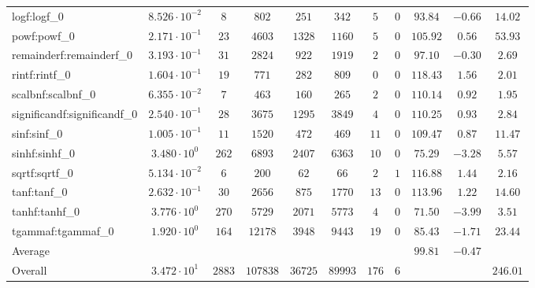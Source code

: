 \begin{tabular}{|l|c|c|c|c|c|c|c|c|c|c|}
logf:logf\_0                 & $ 8.526 \cdot 10^{-2} $ & $ 8      $ & $ 802    $ & $ 251   $ & $ 342   $ & $ 5   $ & $ 0 $ & $ 93.84       $ & $ -0.66   $ & $ 14.02   $ \\
powf:powf\_0                 & $ 2.171 \cdot 10^{-1} $ & $ 23     $ & $ 4603   $ & $ 1328  $ & $ 1160  $ & $ 5   $ & $ 0 $ & $ 105.92      $ & $ 0.56    $ & $ 53.93   $ \\
remainderf:remainderf\_0     & $ 3.193 \cdot 10^{-1} $ & $ 31     $ & $ 2824   $ & $ 922   $ & $ 1919  $ & $ 2   $ & $ 0 $ & $ 97.10       $ & $ -0.30   $ & $ 2.69    $ \\
rintf:rintf\_0               & $ 1.604 \cdot 10^{-1} $ & $ 19     $ & $ 771    $ & $ 282   $ & $ 809   $ & $ 0   $ & $ 0 $ & $ 118.43      $ & $ 1.56    $ & $ 2.01    $ \\
scalbnf:scalbnf\_0           & $ 6.355 \cdot 10^{-2} $ & $ 7      $ & $ 463    $ & $ 160   $ & $ 265   $ & $ 2   $ & $ 0 $ & $ 110.14      $ & $ 0.92    $ & $ 1.95    $ \\
significandf:significandf\_0 & $ 2.540 \cdot 10^{-1} $ & $ 28     $ & $ 3675   $ & $ 1295  $ & $ 3849  $ & $ 4   $ & $ 0 $ & $ 110.25      $ & $ 0.93    $ & $ 2.84    $ \\
sinf:sinf\_0                 & $ 1.005 \cdot 10^{-1} $ & $ 11     $ & $ 1520   $ & $ 472   $ & $ 469   $ & $ 11  $ & $ 0 $ & $ 109.47      $ & $ 0.87    $ & $ 11.47   $ \\
sinhf:sinhf\_0               & $ 3.480 \cdot 10^{0}  $ & $ 262    $ & $ 6893   $ & $ 2407  $ & $ 6363  $ & $ 10  $ & $ 0 $ & $ 75.29       $ & $ -3.28   $ & $ 5.57    $ \\
sqrtf:sqrtf\_0               & $ 5.134 \cdot 10^{-2} $ & $ 6      $ & $ 200    $ & $ 62    $ & $ 66    $ & $ 2   $ & $ 1 $ & $ 116.88      $ & $ 1.44    $ & $ 2.16    $ \\
tanf:tanf\_0                 & $ 2.632 \cdot 10^{-1} $ & $ 30     $ & $ 2656   $ & $ 875   $ & $ 1770  $ & $ 13  $ & $ 0 $ & $ 113.96      $ & $ 1.22    $ & $ 14.60   $ \\
tanhf:tanhf\_0               & $ 3.776 \cdot 10^{0}  $ & $ 270    $ & $ 5729   $ & $ 2071  $ & $ 5773  $ & $ 4   $ & $ 0 $ & $ 71.50       $ & $ -3.99   $ & $ 3.51    $ \\
tgammaf:tgammaf\_0           & $ 1.920 \cdot 10^{0}  $ & $ 164    $ & $ 12178  $ & $ 3948  $ & $ 9443  $ & $ 19  $ & $ 0 $ & $ 85.43       $ & $ -1.71   $ & $ 23.44   $ \\
\hline
Average                      & $                     $ & $        $ & $        $ & $       $ & $       $ & $     $ & $   $ & $ 99.81       $ & $ -0.47   $ & $         $ \\
\hline
Overall                      & $ 3.472 \cdot 10^{1}  $ & $ 2883   $ & $ 107838 $ & $ 36725 $ & $ 89993 $ & $ 176 $ & $ 6 $ & $             $ & $         $ & $ 246.01  $ \\
\hline
\end{tabular}

